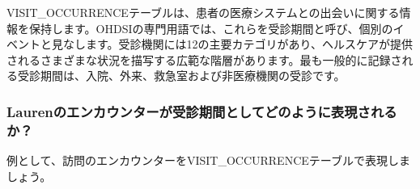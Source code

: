 \documentclass[
  11pt]{book}
\theoremstyle{definition}
\theoremstyle{definition}
\theoremstyle{definition}
\theoremstyle{definition}
\theoremstyle{remark}
\begin{document}
VISIT\_OCCURRENCEテーブルは、患者の医療システムとの出会いに関する情報を保持します。OHDSIの専門用語では、これらを受診期間と呼び、個別のイベントと見なします。受診機関には12の主要カテゴリがあり、ヘルスケアが提供されるさまざまな状況を描写する広範な階層があります。最も一般的に記録される受診期間は、入院、外来、救急室および非医療機関の受診です。

\subsubsection*{Laurenのエンカウンターが受診期間としてどのように表現されるか？}\label{laurenux306eux30a8ux30f3ux30abux30a6ux30f3ux30bfux30fcux304cux53d7ux8a3aux671fux9593ux3068ux3057ux3066ux3069ux306eux3088ux3046ux306bux8868ux73feux3055ux308cux308bux304b}

例として、訪問のエンカウンターをVISIT\_OCCURRENCEテーブルで表現しましょう。
\end{document}
